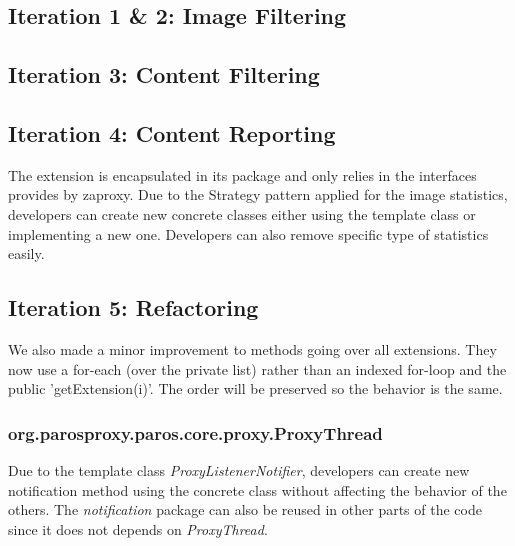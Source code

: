 \subsection{Iteration 1 \& 2: Image Filtering}
\subsection{Iteration 3: Content Filtering}
\subsection{Iteration 4: Content Reporting}
The extension is encapsulated in its package and only relies in the interfaces provides by zaproxy. Due to the Strategy pattern applied for the image statistics, developers can create new concrete classes either using the template class or implementing a new one. Developers can also remove specific type of statistics easily.

\subsection{Iteration 5: Refactoring}
We also made a minor improvement to methods going over all extensions. They now use a for-each (over the private list) rather than an indexed for-loop and the public 'getExtension(i)'. The order will be preserved so the behavior is the same.
\subsubsection{org.parosproxy.paros.core.proxy.ProxyThread}

Due to the template class \textit{ProxyListenerNotifier}, developers can create new notification method using the concrete class without affecting the behavior of the others. The \textit{notification} package can also be reused in other parts of the code since it does not depends on \textit{ProxyThread}. 
